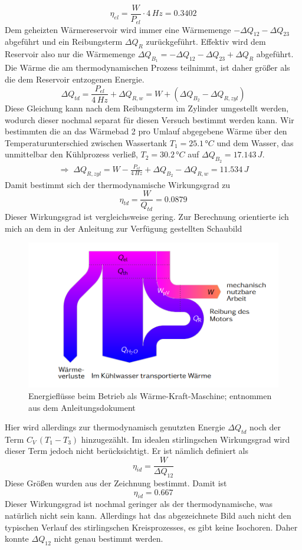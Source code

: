 \documentclass[a4paper, 12pt,]{scrartcl}
\begin{document}
$$\eta_{el}=\frac{W}{P_{el}}\cdot4\,Hz=0.3402$$
Dem geheizten Wärmereservoir wird immer eine Wärmemenge $-\Delta{Q}_{12}-\Delta{Q}_{23}$ abgeführt und ein Reibungsterm $\Delta{Q}_R$ zurückgeführt. Effektiv wird dem Reservoir also nur die Wärmemenge $\Delta{Q}_{B_1}=-\Delta{Q}_{12}-\Delta{Q}_{23}+\Delta{Q}_R$ abgeführt. Die Wärme die am thermodynamischen Prozess teilnimmt, ist daher größer als die dem Reservoir entzogenen Energie.
$$\Delta{Q}_{td}=\frac{P_{el}}{4\,Hz}+\Delta{Q}_{R,w}=W+(\Delta{Q}_{B_2}-\Delta{Q}_{R,zyl})$$
Diese Gleichung kann nach dem Reibungsterm im Zylinder umgestellt werden, wodurch dieser nochmal separat für diesen Versuch bestimmt werden kann. Wir bestimmten die an das Wärmebad 2 pro Umlauf abgegebene Wärme über den Temperaturunterschied zwischen Wassertank $T_1=25.1\,°C$ und dem Wasser, das unmittelbar den Kühlprozess verließ, $T_2=30.2\,°C$ auf $\Delta{Q}_{B_2}=17.143\,J$.
\begin{align*}\Rightarrow\;\Delta{Q}_{R,zyl}=W-\frac{P_{el}}{4\,Hz}+\Delta{Q}_{B_2}-\Delta{Q}_{R,w}=11.534\,J\end{align*}
Damit bestimmt sich der thermodynamische Wirkungsgrad zu
$$\eta_{td}=\frac{W}{Q_{td}}=0.0879$$
Dieser Wirkungsgrad ist vergleichsweise gering. Zur Berechnung orientierte ich mich an dem in der Anleitung zur Verfügung gestellten Schaubild
\begin{figure}[H]\centering\includegraphics[scale=0.8]{Energiebilanz3}\caption{Energieflüsse beim Betrieb als Wärme-Kraft-Maschine; entnommen aus dem Anleitungsdokument}\end{figure}
Hier wird allerdings zur thermodynamisch genutzten Energie $\Delta{Q}_{td}$ noch der Term $C_V\,(T_1-T_3)$ hinzugezählt. Im idealen stirlingschen Wirkungsgrad wird dieser Term jedoch nicht berücksichtigt. Er ist nämlich definiert als
$$\eta_{id}=\frac{W}{\Delta{Q}_{12}}$$
Diese Größen wurden aus der Zeichnung bestimmt. Damit ist
$$\eta_{id}=0.667$$
Dieser Wirkungsgrad ist nochmal geringer als der thermodynamische, was natürlich nicht sein kann. Allerdings hat das abgezeichnete Bild auch nicht den typischen Verlauf des stirlingschen Kreisprozesses, es gibt keine Isochoren. Daher konnte $\Delta{Q}_{12}$ nicht genau bestimmt werden.
\end{document}
